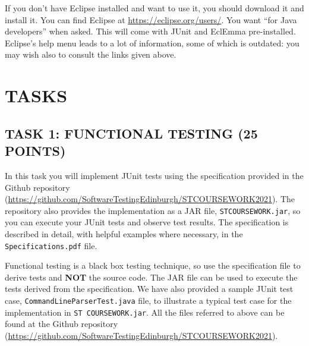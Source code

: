 \documentclass{article}
\begin{document}
If you don't have Eclipse installed and want to use it, you should
download it and install it. You can find Eclipse at
\url{https://eclipse.org/users/}. You want ``for Java developers''
when asked. This will come with JUnit and EclEmma
pre-installed. Eclipse's help menu leads to a lot of information, some
of which is outdated: you may wish also to consult the links given
above.






\section{TASKS}

\subsection{TASK 1: FUNCTIONAL TESTING (25 POINTS)}
In this task you will implement JUnit tests using the specification
provided in the Github repository
(\url{https://github.com/SoftwareTestingEdinburgh/STCOURSEWORK2021}). The
repository also provides the implementation as a JAR file,
\texttt{ST\textunderscore COURSEWORK.jar}, so you can execute your
JUnit tests and observe test results. The specification is described
in detail, with helpful examples where necessary, in the
\texttt{Specifications.pdf} file.

Functional testing is a black box testing technique, so use the
specification file to derive tests and \textbf{NOT} the source
code. The JAR file can be used to execute the tests derived from the
specification. We have also provided a sample JUnit test case,
\texttt{CommandLineParserTest.java} file, to illustrate a typical test
case for the implementation in \texttt{ST\textunderscore
  COURSEWORK.jar}. All the files referred to above can be found at the
Github repository
(\url{https://github.com/SoftwareTestingEdinburgh/STCOURSEWORK2021}).
\end{document}
